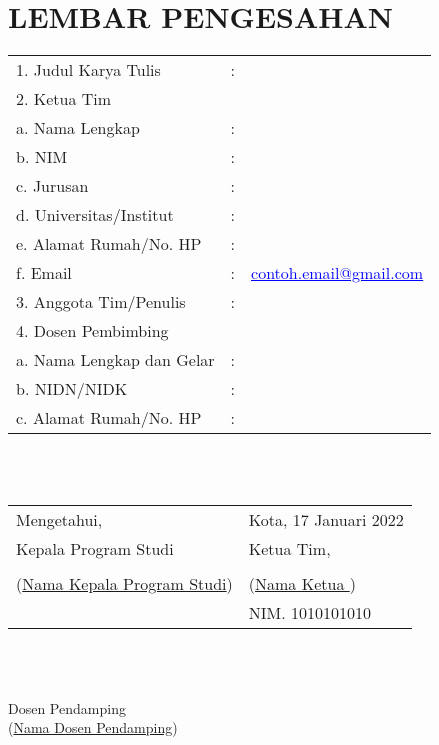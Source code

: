\section*{\centering LEMBAR PENGESAHAN}

\vspace*{1cm}
\begin{tabular}{p{}p{}p{}}
    1. Judul Karya Tulis &:& \\[.5ex]
    2. Ketua Tim & \\[.5ex]
    \quad a. Nama Lengkap &:&  \\[.5ex]
    \quad b. NIM &:& \\[.5ex]
    \quad c. Jurusan &:& \\[.5ex]
    \quad d. Universitas/Institut &:& \\[.5ex]
    \quad e. Alamat Rumah/No. HP &:&  \\[.5ex]
    \quad f. Email &:& \href{mailto:contoh.email@gmail.com}{\textcolor{blue}{\underline{contoh.email@gmail.com}}} \\[.5ex]
    3. Anggota Tim/Penulis &:& \\[.5ex]
    4. Dosen Pembimbing & \\[.5ex]
    \quad a. Nama Lengkap dan Gelar &:& \\[.5ex]
    \quad b. NIDN/NIDK &:& \\[.5ex]
    \quad c. Alamat Rumah/No. HP &:& 
\end{tabular}
\\
\vspace*{1cm}
\\
\begin{tabular}{K{.5\textwidth}K{.5\textwidth}}
     Mengetahui, & Kota, 17 Januari 2022 \\
     Kepala Program Studi & Ketua Tim,\\
     & \\[10ex]
     (\underline{Nama Kepala Program Studi}) & (\underline{\quad\quad Nama Ketua \quad\quad})\\
      & NIM. 1010101010
\end{tabular}
\\
\vspace*{.5cm}
\\
\begin{center}
    Dosen Pendamping\\[12ex]
    (\underline{\quad\quad Nama Dosen Pendamping\quad\quad})
\end{center}